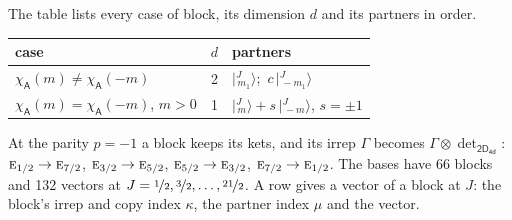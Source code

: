 \documentclass[10pt,a4paper]{article}
\numberwithin{equation}{section}
\newcommand{\grp}[1]{\mathsf{#1}}
\newcommand{\irr}[1]{\text{\normalfont\scshape #1}}
\newcommand{\chiA}{\chi_{\grp{A}}}
\newcommand{\irrprod}{\otimes}
\newcommand{\mult}{\kappa}
\newcommand{\intx}{\mu}
\newcommand{\jm}[2]{\bigl\lvert{}^{#1}_{\,#2}\bigr\rangle}
\begin{document}
\leavevmode\label{n:head.case}\label{n:head.partners}The table lists every case of block, its dimension $d$ and its partners in order.
\begin{center}\begin{tabular}{@{}lrl@{}}\toprule
case & $d$ & partners\\\midrule
$\chiA(m) \ne \chiA(-m)$ & 2 & $\jm{J}{m_1}$;\ $c\,\jm{J}{-m_1}$\\
$\chiA(m) = \chiA(-m)$, $m > 0$ & 1 & $\jm{J}{m} + s\,\jm{J}{-m}$, $s = \pm1$\\
\bottomrule\end{tabular}\end{center}
At the parity $p = -1$ a block keeps its kets, and its irrep $\Gamma$ becomes $\Gamma \irrprod \det_{\grp{2D_{4d}}}$: $\irr{e}_{1/2} \to \irr{e}_{7/2}$, $\irr{e}_{3/2} \to \irr{e}_{5/2}$, $\irr{e}_{5/2} \to \irr{e}_{3/2}$, $\irr{e}_{7/2} \to \irr{e}_{1/2}$.
The bases have 66 blocks and 132 vectors at $J = \nicefrac{1}{2}, \nicefrac{3}{2}, \dots, \nicefrac{21}{2}$. \label{n:head.vector}A row gives a vector of a block at $J$: the block's irrep and copy index $\mult$, the partner index $\intx$ and the vector.
\end{document}
